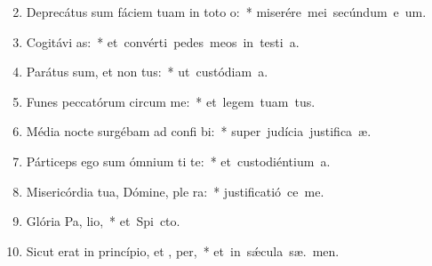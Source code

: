 \begin{flushleft}
\begin{enumerate}[leftmargin=*]
\setcounter{enumi}{1}

\item Deprecátus sum fáciem tuam in toto  o:~* \mbox{miserére mei secúndum e um.}
\item Cogitávi  as:~* \mbox{et convérti pedes meos in testi a.}
\item Parátus sum, et non  tus:~* \mbox{ut custódiam  a.}
\item Funes peccatórum circum  me:~* \mbox{et legem tuam   tus.}
\item Média nocte surgébam ad confi bi:~* \mbox{super judícia justifica æ.}
\item Párticeps ego sum ómnium ti te:~* \mbox{et custodiéntium  a.}
\item Misericórdia tua, Dómine, ple  ra:~* \mbox{justificatió  ce me.}
\item Glória Pa,  lio,~* \mbox{et Spi cto.}
\item Sicut erat in princípio, et ,  per,~* \mbox{et in s\'{\ae}cula sæ. men.}


\end{enumerate}
\end{flushleft}

